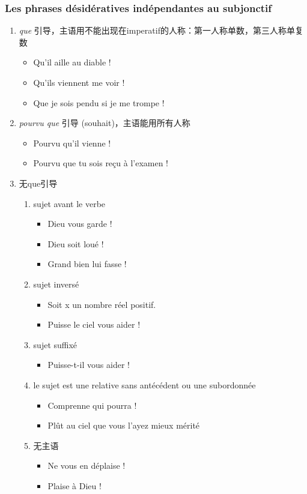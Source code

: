 \documentclass[UTF8]{report}
\begin{document}
\subsubsection{Les phrases désidératives indépendantes au subjonctif}
\begin{enumerate}
    \item \textit{que} 引导，主语用不能出现在imperatif的人称：第一人称单数，第三人称单复数
    \begin{itemize}
        \item Qu’il aille au diable !
        \item Qu’ils viennent me voir !
        \item Que je sois pendu si je me trompe !
    \end{itemize}
    \item \textit{pourvu que} 引导 (souhait)，主语能用所有人称
    \begin{itemize}
        \item Pourvu qu’il vienne !
        \item Pourvu que tu sois reçu à l’examen !
    \end{itemize}
    \item 无que引导
    \begin{enumerate}
        \item sujet avant le verbe 
        \begin{itemize}
            \item Dieu vous garde !
            \item Dieu soit loué !
            \item Grand bien lui fasse !
        \end{itemize}
        \item sujet inversé
        \begin{itemize}
            \item Soit x un nombre réel positif.
            \item Puisse le ciel vous aider !
        \end{itemize}
        \item sujet suffixé
        \begin{itemize}
            \item Puisse-t-il vous aider !
        \end{itemize}
        \item le sujet est une relative sans antécédent ou une subordonnée
        \begin{itemize}
            \item Comprenne qui pourra !
            \item Plût au ciel que vous l’ayez mieux mérité
        \end{itemize}
        \item 无主语
        \begin{itemize}
            \item Ne vous en déplaise !
            \item Plaise à Dieu !
        \end{itemize}
    \end{enumerate}
\end{enumerate}
\end{document}
